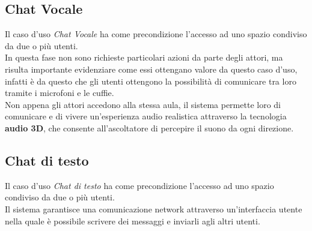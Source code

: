 \subsection{Chat Vocale}
Il caso d'uso \textit{Chat Vocale} ha come precondizione l'accesso ad uno spazio condiviso da due o più utenti. \\In questa fase non sono richieste particolari azioni da parte degli attori, ma risulta importante evidenziare come essi ottengano valore da questo caso d'uso, infatti è da questo che gli utenti ottengono la possibilità di comunicare tra loro tramite i microfoni e le cuffie.
\\Non appena gli attori accedono alla stessa aula, il sistema permette loro di comunicare e di vivere un'esperienza audio realistica attraverso la tecnologia \textbf{audio 3D}, che consente all'ascoltatore di percepire il suono da ogni direzione.
\subsection{Chat di testo}
Il caso d'uso \textit{Chat di testo} ha come precondizione l'accesso ad uno spazio condiviso da due o più utenti.
\\Il sistema garantisce una comunicazione network attraverso un'interfaccia utente nella quale è possibile scrivere dei messaggi e inviarli agli altri utenti.
